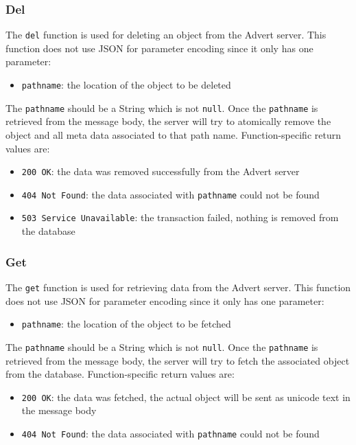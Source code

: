 \subsubsection{Del}
\label{del}
The \texttt{del} function is used for deleting an object from the Advert
server. This function does not use JSON for parameter encoding since it only
has one parameter:

\begin{itemize}
  \item \texttt{pathname}: the location of the object to be deleted
\end{itemize}

The \texttt{pathname} should be a String which is not \texttt{null}. Once the
\texttt{pathname} is retrieved from the message body, the server will try to
atomically remove the object and all meta data associated to that path name.
Function-specific return values are:

\begin{itemize}
  \item \texttt{200 OK}: the data was removed successfully from the Advert
  server
  \item \texttt{404 Not Found}: the data associated with \texttt{pathname}
  could not be found
  \item \texttt{503 Service Unavailable}: the transaction failed, nothing is
  removed from the database
\end{itemize}

\subsubsection{Get}
\label{get}
The \texttt{get} function is used for retrieving data from the Advert server.
This function does not use JSON for parameter encoding since it only has one
parameter:

\begin{itemize}
  \item \texttt{pathname}: the location of the object to be fetched
\end{itemize}

The \texttt{pathname} should be a String which is not \texttt{null}. Once the
\texttt{pathname} is retrieved from the message body, the server will try to
fetch the associated object from the database. Function-specific return values
are:

\begin{itemize}
  \item \texttt{200 OK}: the data was fetched, the actual object will be sent
  as unicode text in the message body
  \item \texttt{404 Not Found}: the data associated with \texttt{pathname}
  could not be found
\end{itemize}

